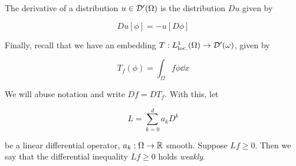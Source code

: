 \documentclass{article}
\begin{document}
\begin{definition}
    [derivative]

    The derivative of a distribution \(u \in \mathcal{D}'(\Omega)\) is the distribution \(Du\) given by

    \[Du[\phi] = -u[D\phi]\]
\end{definition}

Finally, recall that we have an embedding \(T : L^1_\text{loc.}(\Omega) \to \mathcal{D}'(\omega)\), given by

\[T_f(\phi) = \int_\Omega f\phi \dd x\]

We will abuse notation and write \(Df = DT_f\). With this, let

\[L = \sum_{k=0}^d a_k D^k\]

be a linear differential operator, \(a_k : \Omega \to \mathbb{R}\) smooth. Suppose \(Lf \ge 0\). Then we say that the differential inequality \(Lf \ge 0\) holds \emph{weakly}.

\printbibliography
\end{document}
